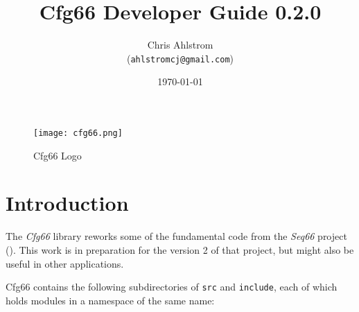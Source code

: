 \documentclass[
 11pt,
 twoside,
 a4paper,
 final                                 %
]{article}
\begin{document}
\title{Cfg66 Developer Guide 0.2.0}
\author{Chris Ahlstrom \\
   (\texttt{ahlstromcj@gmail.com})}
\date{\today}
\maketitle

\begin{figure}[H]
   \centering 
   \texttt{[image: cfg66.png]}
   \caption*{Cfg66 Logo}
\end{figure}

\clearpage                             %

\tableofcontents
\listoffigures                         %
\listoftables                          %


\setlength{\parindent}{2em}
\setlength{\parskip}{1ex plus 0.5ex minus 0.2ex}

\rhead{\rightmark}         %

\section{Introduction}
\label{sec:introduction}

   The \textsl{Cfg66} library reworks some of the fundamental code
   from the \textsl{Seq66} project (\cite{seq66}).
   This work is in preparation for the version 2 of that project, but
   might also be useful in other applications.

   Cfg66 contains the following subdirectories of \texttt{src} and
   \texttt{include}, each of which holds modules in a
   namespace of the same name:
\end{document}
